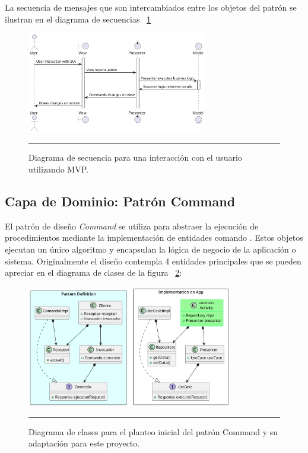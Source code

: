 La secuencia de mensajes que son intercambiados entre los objetos del patrón se ilustran en el diagrama de secuencias ~\ref{fig:uml_mvp_sequence}

\begin{figure}[htbp]
	\centering
	\includegraphics[width=0.7\textwidth]{Figures/design/SEQ_mvp.png}
	\rule{35em}{1pt}
	\caption[MVP Sequence]{Diagrama de secuencia para una interacción con el usuario utilizando MVP.}
	\label{fig:uml_mvp_sequence}
\end{figure}


\subsection{Capa de Dominio: Patrón Command}
El patrón de diseño \emph{Command} se utiliza para abstraer la ejecución de procedimientos mediante la implementación de entidades comando \cite{comm_sugrue}. Estos objetos ejecutan un único algoritmo y encapsulan la lógica de negocio de la aplicación o sistema.
Originalmente el diseño contempla 4 entidades principales que se pueden apreciar en el diagrama de clases de la figura ~\ref{fig:uml_clases_commander}:

\begin{figure}[htbp]
	\centering
	\includegraphics[width=0.8\textwidth]{Figures/design/CLASS_command_versus.png}
	\rule{35em}{1pt}
	\caption[Commander Classes]{Diagrama de clases para el planteo inicial del patrón Command y su adaptación para este proyecto.}
	\label{fig:uml_clases_commander}
\end{figure}

